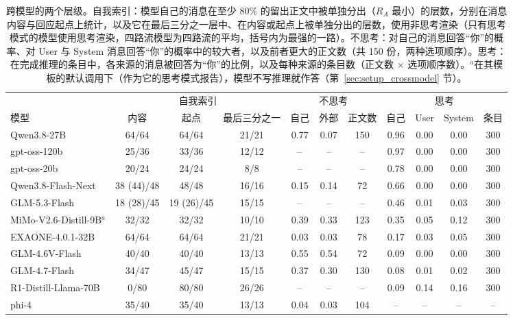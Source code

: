 \begin{table}[htbp]
\centering
\caption{跨模型的两个层级。自我索引：模型自己的消息在至少 80\% 的留出正文中被单独分出（\(R_A\) 最小）的层数，分别在消息内容与回应起点上统计，以及它在最后三分之一层中、在内容或起点上被单独分出的层数，使用非思考渲染（只有思考模式的模型使用思考渲染，四路流模型为四路流的平均，括号内为最强的一路）。不思考：对自己的消息回答“你”的概率、对 User 与 System 消息回答“你”的概率中的较大者，以及前者更大的正文数（共 150 份，两种选项顺序）。思考：在完成推理的条目中，各来源的消息被回答为“你”的比例，以及每种来源的条目数（正文数 \(\times\) 选项顺序数）。$^{a}$在其模板的默认调用下（作为它的思考模式报告），模型不写推理就作答（第~\ref{sec:setup_crossmodel} 节）。}
\label{tab:self_crossmodel}
\footnotesize
\setlength{\tabcolsep}{3.2pt}
\begin{tabular}{lcccccccccc}
\toprule
& \multicolumn{3}{c}{自我索引} & \multicolumn{3}{c}{不思考} & \multicolumn{4}{c}{思考} \\
\cmidrule(lr){2-4}\cmidrule(lr){5-7}\cmidrule(lr){8-11}
模型 & 内容 & 起点 & 最后三分之一 & 自己 & 外部 & 正文数 & 自己 & User & System & 条目 \\
\midrule
Qwen3.8-27B & 64/64 & 64/64 & 21/21 & 0.77 & 0.07 & 150 & 0.96 & 0.00 & 0.00 & 300 \\
gpt-oss-120b & 25/36 & 33/36 & 12/12 & -- & -- & -- & 0.97 & 0.00 & 0.00 & 300 \\
gpt-oss-20b & 20/24 & 24/24 & 8/8 & -- & -- & -- & 0.78 & 0.00 & 0.00 & 300 \\
Qwen3.8-Flash-Next & 38 (44)/48 & 48/48 & 16/16 & 0.15 & 0.14 & 72 & 0.66 & 0.00 & 0.00 & 300 \\
GLM-5.3-Flash & 18 (28)/45 & 19 (26)/45 & 15/15 & -- & -- & -- & 0.46 & 0.01 & 0.03 & 300 \\
MiMo-V2.6-Distill-9B$^{a}$ & 32/32 & 32/32 & 10/10 & 0.39 & 0.33 & 123 & 0.35 & 0.05 & 0.12 & 300 \\
EXAONE-4.0.1-32B & 64/64 & 64/64 & 21/21 & 0.03 & 0.03 & 78 & 0.17 & 0.03 & 0.05 & 300 \\
GLM-4.6V-Flash & 40/40 & 40/40 & 13/13 & 0.55 & 0.54 & 72 & 0.09 & 0.00 & 0.00 & 300 \\
GLM-4.7-Flash & 34/47 & 45/47 & 15/15 & 0.37 & 0.30 & 130 & 0.08 & 0.01 & 0.02 & 300 \\
R1-Distill-Llama-70B & 0/80 & 80/80 & 26/26 & -- & -- & -- & 0.09 & 0.14 & 0.16 & 300 \\
phi-4 & 35/40 & 35/40 & 13/13 & 0.04 & 0.03 & 104 & -- & -- & -- & -- \\

\end{tabular}
\end{table}

